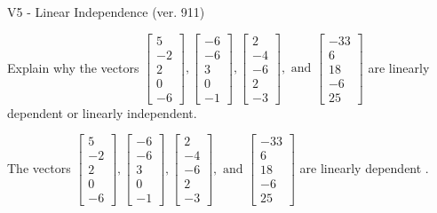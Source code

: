 \begin{exercise}
  \begin{exerciseTitle}V5 - Linear Independence (ver. 911)\end{exerciseTitle}
  \begin{exerciseStatement}
    Explain why the vectors \(\left[\begin{array}{r}
5 \\
-2 \\
2 \\
0 \\
-6
\end{array}\right] , \left[\begin{array}{r}
-6 \\
-6 \\
3 \\
0 \\
-1
\end{array}\right] , \left[\begin{array}{r}
2 \\
-4 \\
-6 \\
2 \\
-3
\end{array}\right] , \text{ and } \left[\begin{array}{r}
-33 \\
6 \\
18 \\
-6 \\
25
\end{array}\right]\) are linearly dependent or linearly independent.	


  \end{exerciseStatement}
  \begin{exerciseAnswer}
   The vectors \(\left[\begin{array}{r}
5 \\
-2 \\
2 \\
0 \\
-6
\end{array}\right] , \left[\begin{array}{r}
-6 \\
-6 \\
3 \\
0 \\
-1
\end{array}\right] , \left[\begin{array}{r}
2 \\
-4 \\
-6 \\
2 \\
-3
\end{array}\right] , \text{ and } \left[\begin{array}{r}
-33 \\
6 \\
18 \\
-6 \\
25
\end{array}\right]\) are 
  	 linearly dependent  .
  


  \end{exerciseAnswer}
\end{exercise}